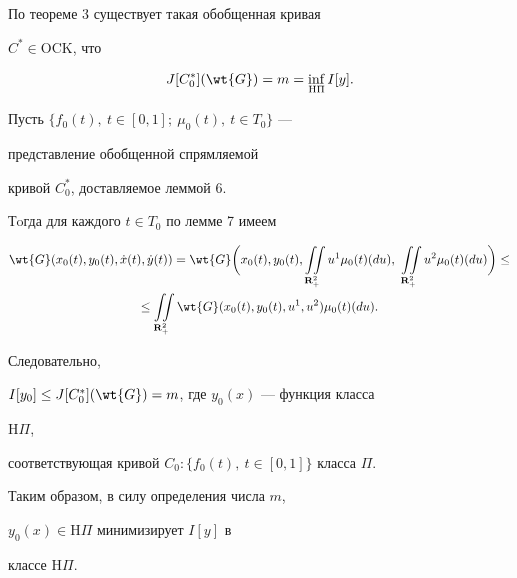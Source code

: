 \begin{pf}


По теореме 3 существует такая обобщенная кривая


$C^*\in \mathrm{OCK}$, что


$$


J[C^*_0](\wt{G})=m=\inf_{\mathrm H\Pi}I[y].


$$


Пусть $\{f_0(t),\ t\in [0,1];\ \mu_0(t),\ t\in T_0\}$ ---


представление обобщенной спрямляемой


кривой $C^*_0$, доставляемое леммой 6.


Тoгда для каждого $t\in T_0$ по лемме 7 имеем


\begin{multline*}


\wt{G}(x_0(t),y_0(t),\Dot{x}(t),\Dot{y}(t))=\wt{G}\bigg(x_0(t),y_0(t),


\iint\limits_{{\bold R}^2_+} u^1\mu_0(t)(du),\ \iint\limits_{{\bold


R}^2_+} u^2\mu_0(t)(du)\bigg)\leq\\


%


\leq\iint\limits_{{\bold R}^2_+}


\wt{G}(x_0(t),y_0(t), u^1,u^2)\mu_0(t)(du).


\end{multline*}


Следовательно,


$I[y_0] \leq J[C^*_0](\wt{G})=m$, где $y_0(x)$ --- функция класса


$\mathrm H\Pi$,


соответствующая кривой $C_0:\{f_0(t),\ t\in [0,1] \}$ класса $\Pi$.


Таким образом, в силу определения числа $m$,


$y_0(x)\in\mathrm H\Pi$ минимизирует $I[y]$ в


классе $\mathrm H\Pi$.


\end{pf}





